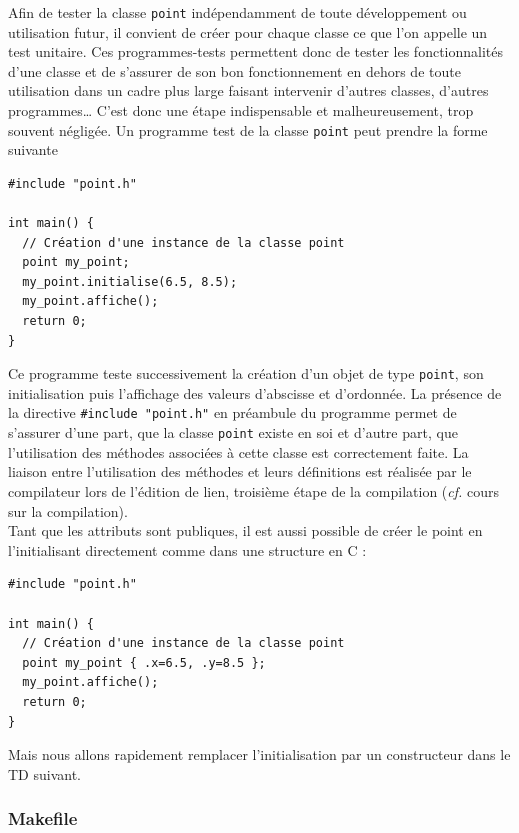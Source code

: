 \documentclass{book}
\begin{document}
\begin{correction}
Afin de tester la classe \texttt{point} indépendamment de toute développement ou
utilisation futur, il convient de créer pour chaque classe ce que l'on appelle
un test unitaire. Ces programmes-tests permettent donc de tester les
fonctionnalités d'une classe et de s'assurer de son bon fonctionnement en dehors
de toute utilisation dans un cadre plus large faisant intervenir d'autres
classes, d'autres programmes\ldots{} C'est donc une étape indispensable et
malheureusement, trop souvent négligée. Un programme test de la classe \texttt{point}
peut prendre la forme suivante

\begin{verbatim}
#include "point.h"

int main() {
  // Création d'une instance de la classe point
  point my_point;
  my_point.initialise(6.5, 8.5);
  my_point.affiche();
  return 0;
}
\end{verbatim}

Ce programme teste successivement la création d'un objet de type \texttt{point}, son
initialisation puis l'affichage des valeurs d'abscisse et d'ordonnée. La
présence de la directive \texttt{\#include "point.h"} en préambule du programme
permet de s'assurer d'une part, que la classe \texttt{point} existe en soi et d'autre
part, que l'utilisation des méthodes associées à cette classe est correctement
faite. La liaison entre l'utilisation des méthodes et leurs définitions est
réalisée par le compilateur lors de l'édition de lien, troisième étape de la
compilation (\emph{cf.} cours sur la compilation).\\

Tant que les attributs sont publiques, il est aussi possible de créer le point en l'initialisant directement comme dans une structure en C :
\begin{verbatim}
#include "point.h"

int main() {
  // Création d'une instance de la classe point
  point my_point { .x=6.5, .y=8.5 };
  my_point.affiche();
  return 0;
}
\end{verbatim}
Mais nous allons rapidement remplacer l'initialisation par un constructeur dans le TD suivant.

\subsubsection*{Makefile}


\end{correction}
\end{document}
